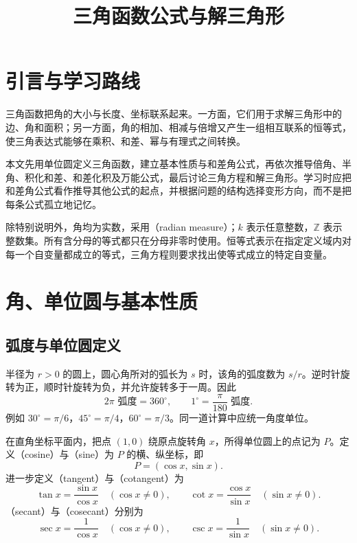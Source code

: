 \documentclass[UTF8]{ctexart}
\title{三角函数公式与解三角形}
\author{}
\date{}
\begin{document}
\maketitle
\tableofcontents

\section{引言与学习路线}

三角函数把角的大小与长度、坐标联系起来。一方面，它们用于求解三角形中的边、角和面积；另一方面，角的相加、相减与倍增又产生一组相互联系的恒等式，使三角表达式能够在乘积、和差、幂与有理式之间转换。

本文先用单位圆定义三角函数，建立基本性质与和差角公式，再依次推导倍角、半角、积化和差、和差化积及万能公式，最后讨论三角方程和解三角形。学习时应把和差角公式看作推导其他公式的起点，并根据问题的结构选择变形方向，而不是把每条公式孤立地记忆。

除特别说明外，角均为实数，采用（radian measure）；$k$ 表示任意整数，$\mathbb Z$ 表示整数集。所有含分母的等式都只在分母非零时使用。恒等式表示在指定定义域内对每一个自变量都成立的等式，三角方程则要求找出使等式成立的特定自变量。

\section{角、单位圆与基本性质}
\label{sec:trig-basics}

\subsection{弧度与单位圆定义}

半径为 $r>0$ 的圆上，圆心角所对的弧长为 $s$ 时，该角的弧度数为 $s/r$。逆时针旋转为正，顺时针旋转为负，并允许旋转多于一周。因此
\[
  2\pi\text{ 弧度}=360^\circ,\qquad
  1^\circ=\frac{\pi}{180}\text{ 弧度}.
\]
例如 $30^\circ=\pi/6$，$45^\circ=\pi/4$，$60^\circ=\pi/3$。同一道计算中应统一角度单位。

\begin{definition}[三角函数]
在直角坐标平面内，把点 $(1,0)$ 绕原点旋转角 $x$，所得单位圆上的点记为 $P$。定义（cosine）与（sine）为 $P$ 的横、纵坐标，即
\[
  P=(\cos x,\sin x).
\]
进一步定义（tangent）与（cotangent）为
\[
  \tan x=\frac{\sin x}{\cos x}\quad(\cos x\ne0),\qquad
  \cot x=\frac{\cos x}{\sin x}\quad(\sin x\ne0).
\]
（secant）与（cosecant）分别为
\[
  \sec x=\frac1{\cos x}\quad(\cos x\ne0),\qquad
  \csc x=\frac1{\sin x}\quad(\sin x\ne0).
\]
\end{definition}
\end{document}

